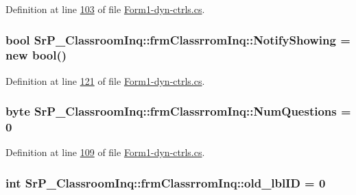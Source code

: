 \-Definition at line \hyperlink{_form1-dyn-ctrls_8cs_source_l00103}{103} of file \hyperlink{_form1-dyn-ctrls_8cs_source}{\-Form1-\/dyn-\/ctrls.\-cs}.

\hypertarget{class_sr_p___classroom_inq_1_1frm_classrrom_inq_a13f540b89ba154a7b133ae266eeb18aa}{
\subsubsection[{\-Notify\-Showing}]{\setlength{\rightskip}{0pt plus 5cm}bool {\bf \-Sr\-P\-\_\-\-Classroom\-Inq\-::frm\-Classrrom\-Inq\-::\-Notify\-Showing} = new bool()}}
\label{class_sr_p___classroom_inq_1_1frm_classrrom_inq_a13f540b89ba154a7b133ae266eeb18aa}


\-Definition at line \hyperlink{_form1-dyn-ctrls_8cs_source_l00121}{121} of file \hyperlink{_form1-dyn-ctrls_8cs_source}{\-Form1-\/dyn-\/ctrls.\-cs}.

\hypertarget{class_sr_p___classroom_inq_1_1frm_classrrom_inq_a7e4d497088afdd32623b3b54749210a0}{
\subsubsection[{\-Num\-Questions}]{\setlength{\rightskip}{0pt plus 5cm}byte {\bf \-Sr\-P\-\_\-\-Classroom\-Inq\-::frm\-Classrrom\-Inq\-::\-Num\-Questions} = 0}}
\label{class_sr_p___classroom_inq_1_1frm_classrrom_inq_a7e4d497088afdd32623b3b54749210a0}


\-Definition at line \hyperlink{_form1-dyn-ctrls_8cs_source_l00109}{109} of file \hyperlink{_form1-dyn-ctrls_8cs_source}{\-Form1-\/dyn-\/ctrls.\-cs}.

\hypertarget{class_sr_p___classroom_inq_1_1frm_classrrom_inq_ac56e0f039ce0113331d9bdd322b30827}{
\subsubsection[{old\-\_\-lbl\-I\-D}]{\setlength{\rightskip}{0pt plus 5cm}int {\bf \-Sr\-P\-\_\-\-Classroom\-Inq\-::frm\-Classrrom\-Inq\-::old\-\_\-lbl\-I\-D} = 0}}
\label{class_sr_p___classroom_inq_1_1frm_classrrom_inq_ac56e0f039ce0113331d9bdd322b30827}


